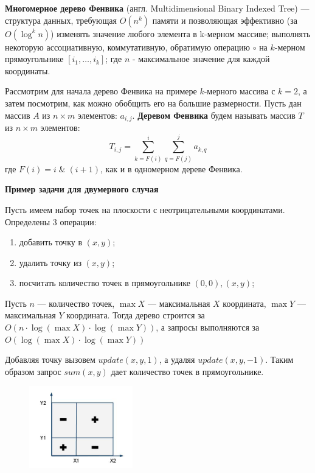 \textbf{Многомерное дерево Фенвика} (англ. Multidimensional Binary Indexed Tree) — структура данных, требующая $O(n^k)$ памяти и позволяющая эффективно (за $O(\log^k n)$)
изменять значение любого элемента в k-мерном массиве;
выполнять некоторую ассоциативную, коммутативную, обратимую операцию $\circ$ на $k$-мерном прямоугольнике $[i_1,\ldots,i_k]$;
где $n$ - максимальное значение для каждой координаты.
\\ \par \noindent Рассмотрим для начала дерево Фенвика на примере $k$-мерного массива с $k=2$, а затем посмотрим, как можно обобщить его на большие размерности.
\newline Пусть дан массив $A$ из $n\times m$ элементов: $a_{i,j}$.
\textbf{Деревом Фенвика} будем называть массив $T$ из $n\times m$ элементов: $$T_{i,j}=\sum_{k=F(i)}^{i}\sum_{q=F(j)}^{j}a_{k,q}$$ где $F(i)=i \; \& \; (i+1)$, как и в одномерном дереве Фенвика.
\\ \par \textbf{Пример задачи для двумерного случая}
\par \noindent Пусть имеем набор точек на плоскости с неотрицательными координатами. Определены 3 операции:
\begin{enumerate}
    \item добавить точку в $(x,y)$;
    \item удалить точку из $(x,y)$;
    \item посчитать количество точек в прямоугольнике $(0,0),(x,y)$;
\end{enumerate}
Пусть $n$ — количество точек, $\max X$ — максимальная $X$ координата, $\max Y$ — максимальная $Y$ координата.
Тогда дерево строится за $O(n\cdot \log (\max X)\cdot \log (\max Y))$, а запросы выполняются за $O(\log (\max X)\cdot \log (\max Y))$

Добавляя точку вызовем $update(x,y,1)$, а удаляя $update(x,y,-1)$. Таким образом запрос $sum(x,y)$ дает количество точек в прямоугольнике. \newline

\begin{figure}
\vspace{-6ex}
\centering
\includegraphics[width=0.4\textwidth]{images/70-75_vvk}
\end{figure}


